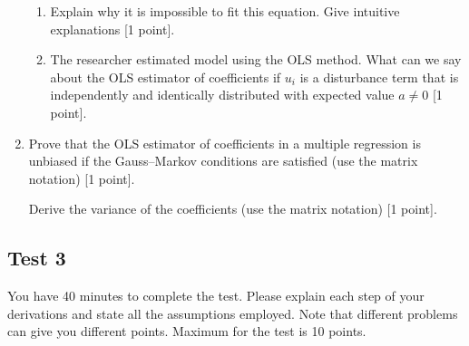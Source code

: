 \begin{enumerate}
\begin{enumerate}
\item Explain why it is impossible to fit this equation. Give intuitive explanations [1 point].
\item The researcher estimated model using the OLS method. What can we say about the OLS estimator
of coefficients if $u_i$ is a disturbance term that is independently and identically distributed with
expected value $a\neq 0$ [1 point].
\end{enumerate}


\item Prove that the OLS estimator of coefficients in a multiple regression is unbiased 
if the Gauss–Markov conditions are satisfied (use the matrix notation) [1 point].

Derive the variance of the coefficients (use the matrix notation) [1 point].

\end{enumerate}


\subsection{Test 3}
You have 40 minutes to complete the test. Please explain each step of your derivations and state
all the assumptions employed. Note that different problems can give you different points.
Maximum for the test is 10 points.

